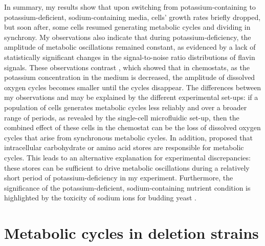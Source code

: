 In summary, my results show that upon switching from potassium-containing to potassium-deficient, sodium-containing media, cells' growth rates briefly dropped, but soon after, some cells resumed generating metabolic cycles and dividing in synchrony.
My observations also indicate that during potassium-deficiency, the amplitude of metabolic oscillations remained constant, as evidenced by a lack of statistically significant changes in the signal-to-noise ratio distributions of flavin signals.
These observations contrast \textcite{oneillEukaryoticCellBiology2020}, which showed that in chemostats, as the potassium concentration in the medium is decreased, the amplitude of dissolved oxygen cycles becomes smaller until the cycles disappear.
The differences between my observations and \textcite{oneillEukaryoticCellBiology2020} may be explained by the different experimental set-ups: if a population of cells generates metabolic cycles less reliably and over a broader range of periods, as revealed by the single-cell microfluidic set-up, then the combined effect of these cells in the chemostat can be the loss of dissolved oxygen cycles that arise from synchronous metabolic cycles.
In addition, \textcite{oneillEukaryoticCellBiology2020} proposed that intracellular carbohydrate or amino acid stores are responsible for metabolic cycles.
This leads to an alternative explanation for experimental discrepancies: these stores can be sufficient to drive metabolic oscillations during a relatively short period of potassium-deficiency in my experiment.
Furthermore, the significance of the potassium-deficient, sodium-containing nutrient condition is highlighted by the toxicity of sodium ions for budding yeast \parencite{arinoAlkaliMetalCation2010,caseyEffectSaltsCofermentation2013,watcharawipasSodiumAcetateResponses2018}.


\section{Metabolic cycles in deletion strains}
\label{sec:biology-deletions}


